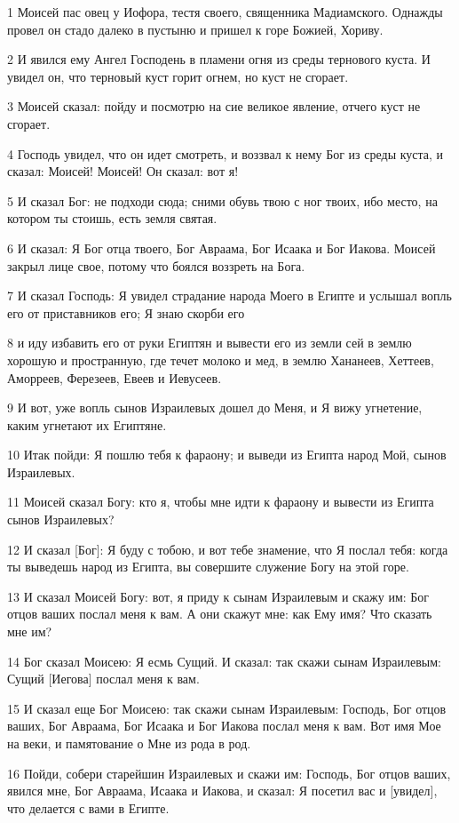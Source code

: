 \par 1 Моисей пас овец у Иофора, тестя своего, священника Мадиамского. Однажды провел он стадо далеко в пустыню и пришел к горе Божией, Хориву.
\par 2 И явился ему Ангел Господень в пламени огня из среды тернового куста. И увидел он, что терновый куст горит огнем, но куст не сгорает.
\par 3 Моисей сказал: пойду и посмотрю на сие великое явление, отчего куст не сгорает.
\par 4 Господь увидел, что он идет смотреть, и воззвал к нему Бог из среды куста, и сказал: Моисей! Моисей! Он сказал: вот я!
\par 5 И сказал Бог: не подходи сюда; сними обувь твою с ног твоих, ибо место, на котором ты стоишь, есть земля святая.
\par 6 И сказал: Я Бог отца твоего, Бог Авраама, Бог Исаака и Бог Иакова. Моисей закрыл лице свое, потому что боялся воззреть на Бога.
\par 7 И сказал Господь: Я увидел страдание народа Моего в Египте и услышал вопль его от приставников его; Я знаю скорби его
\par 8 и иду избавить его от руки Египтян и вывести его из земли сей в землю хорошую и пространную, где течет молоко и мед, в землю Хананеев, Хеттеев, Аморреев, Ферезеев, Евеев и Иевусеев.
\par 9 И вот, уже вопль сынов Израилевых дошел до Меня, и Я вижу угнетение, каким угнетают их Египтяне.
\par 10 Итак пойди: Я пошлю тебя к фараону; и выведи из Египта народ Мой, сынов Израилевых.
\par 11 Моисей сказал Богу: кто я, чтобы мне идти к фараону и вывести из Египта сынов Израилевых?
\par 12 И сказал [Бог]: Я буду с тобою, и вот тебе знамение, что Я послал тебя: когда ты выведешь народ из Египта, вы совершите служение Богу на этой горе.
\par 13 И сказал Моисей Богу: вот, я приду к сынам Израилевым и скажу им: Бог отцов ваших послал меня к вам. А они скажут мне: как Ему имя? Что сказать мне им?
\par 14 Бог сказал Моисею: Я есмь Сущий. И сказал: так скажи сынам Израилевым: Сущий [Иегова] послал меня к вам.
\par 15 И сказал еще Бог Моисею: так скажи сынам Израилевым: Господь, Бог отцов ваших, Бог Авраама, Бог Исаака и Бог Иакова послал меня к вам. Вот имя Мое на веки, и памятование о Мне из рода в род.
\par 16 Пойди, собери старейшин Израилевых и скажи им: Господь, Бог отцов ваших, явился мне, Бог Авраама, Исаака и Иакова, и сказал: Я посетил вас и [увидел], что делается с вами в Египте.
